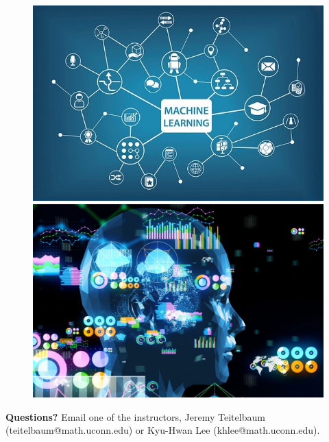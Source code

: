 \documentclass[12pt,letterpaper]{amsart}
\theoremstyle{plain}
\theoremstyle{definition}
\numberwithin{equation}{section}
\begin{document}
\begin{figure}[ht]
   \center
   \includegraphics[scale=.35]{ml.jpeg} \hspace{1cm}      \includegraphics[scale=.105]{ml-2.jpeg}  
\end{figure}



{\bf Questions?} Email one of the instructors, Jeremy Teitelbaum (teitelbaum@math.uconn.edu) or Kyu-Hwan Lee (khlee@math.uconn.edu).
\end{document}
